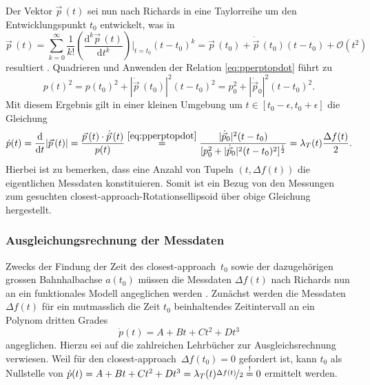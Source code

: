 \documentclass[a4paper,12pt]{article}
\numberwithin{equation}{section}
\begin{document}
Der Vektor $\vec{p}\,(t)$ sei nun nach Richards in eine Taylorreihe um den Entwicklungspunkt $t_0$ entwickelt, was in \begin{equation}
\vec{p}\,(t) = \sum_{k=0}^{\infty}\frac{1}{k!}\left(\frac{\mathrm{d}^{k}\vec{p}\,(t)}{\mathrm{d}t^k}\right)\bigg|_{t=t_0}(t-t_0)^k = \vec{p}\,(t_0) + \dot{\vec{p}}\,(t_0)(t-t_0) + \mathcal{O}(t^2)
\end{equation} resultiert \cite[S.1730]{Richards.1961}. Quadrieren und Anwenden der Relation \eqref{eq:pperptopdot} führt zu \begin{equation}
p(t)^2 = p(t_0)^2 + |\dot{\vec{p}}\,(t_0)|^2(t-t_0)^2 = p_0^2 + |\dot{\vec{p}}_0|^2(t-t_0)^2.
\end{equation} Mit diesem Ergebnis gilt in einer kleinen Umgebung um $t \in [t_0-\epsilon,t_0+\epsilon]$ die Gleichung \begin{equation}\label{eq:bezugdopplermessdaten}
\dot{p}(t) = \frac{\mathrm{d}}{\mathrm{d}t}|\vec{p}\,(t)| = \frac{\vec{p}\,(t)\cdot\dot{\vec{p}}\,(t)}{p(t)}  \overset{\eqref{eq:pperptopdot}}{=} \frac{|\dot{\vec{p}}_0|^2(t-t_0)}{[p_0^2+|\dot{\vec{p}}_0|^2(t-t_0)^2]^{\frac{1}{2}}} = \lambda_T(t)\frac{\Delta f(t)}{2}.
\end{equation} Hierbei ist zu bemerken, dass eine Anzahl von Tupeln $(t, \Delta f(t))$ die eigentlichen Messdaten konstituieren. Somit ist ein Bezug von den Messungen zum gesuchten \flqq closest-approach\frqq-Rotationsellipsoid über obige Gleichung hergestellt.

\subsubsection{Ausgleichungsrechnung der Messdaten}
Zwecks der Findung der Zeit des \flqq closest-approach\frqq\ $t_0$ sowie der dazugehörigen grossen Bahnhalbachse $a(t_0)$ müssen die Messdaten $\Delta f(t)$ nach Richards nun an ein funktionales Modell angeglichen werden \cite[S.1731]{Richards.1961}. Zunächst werden die Messdaten $\Delta f(t)$ für ein mutmasslich die Zeit $t_0$ beinhaltendes Zeitintervall an ein Polynom dritten Grades \begin{equation}
\dot{p}(t) = A+Bt+Ct^2+Dt^3
\end{equation} angeglichen. Hierzu sei auf die zahlreichen Lehrbücher zur Ausgleichsrechnung verwiesen. Weil für den \flqq closest-approach\frqq\ $\Delta f(t_0) = 0$ gefordert ist, kann $t_0$ als Nullstelle von $\dot{p}(t) = A+Bt+Ct^2+Dt^3 = \lambda_T(t)\nicefrac{\Delta f(t)}{2} \overset{!}{=} 0$ ermittelt werden.
\end{document}
